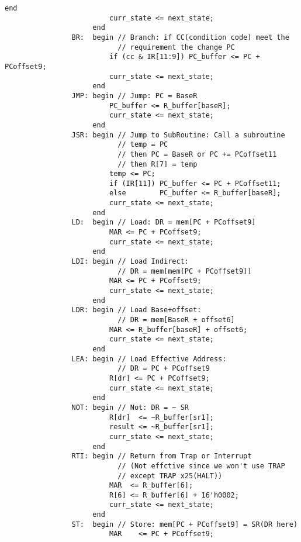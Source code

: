 \documentclass[UTF8,fontset=fandol]{ctexart}
\begin{document}
\begin{lstlisting}[style = verilogstyle, caption = 模块文件源代码, label = Code:Source, breaklines = true]
                         end
                         curr_state <= next_state;
                     end
                BR:  begin // Branch: if CC(condition code) meet the
                           // requirement the change PC
                         if (cc & IR[11:9]) PC_buffer <= PC + PCoffset9;
                         curr_state <= next_state;
                     end
                JMP: begin // Jump: PC = BaseR
                         PC_buffer <= R_buffer[baseR];
                         curr_state <= next_state;
                     end
                JSR: begin // Jump to SubRoutine: Call a subroutine
                           // temp = PC
                           // then PC = BaseR or PC += PCoffset11
                           // then R[7] = temp
                         temp <= PC;
                         if (IR[11]) PC_buffer <= PC + PCoffset11;
                         else        PC_buffer <= R_buffer[baseR];
                         curr_state <= next_state;
                     end
                LD:  begin // Load: DR = mem[PC + PCoffset9]
                         MAR <= PC + PCoffset9;
                         curr_state <= next_state;
                     end
                LDI: begin // Load Indirect: 
                           // DR = mem[mem[PC + PCoffset9]]
                         MAR <= PC + PCoffset9;
                         curr_state <= next_state;
                     end
                LDR: begin // Load Base+offset:
                           // DR = mem[BaseR + offset6]
                         MAR <= R_buffer[baseR] + offset6;
                         curr_state <= next_state;
                     end
                LEA: begin // Load Effective Address:
                           // DR = PC + PCoffset9
                         R[dr] <= PC + PCoffset9;
                         curr_state <= next_state;
                     end
                NOT: begin // Not: DR = ~ SR
                         R[dr]  <= ~R_buffer[sr1];
                         result <= ~R_buffer[sr1];
                         curr_state <= next_state;
                     end
                RTI: begin // Return from Trap or Interrupt
                           // (Not effctive since we won't use TRAP
                           // except TRAP x25(HALT))
                         MAR  <= R_buffer[6];
                         R[6] <= R_buffer[6] + 16'h0002;
                         curr_state <= next_state;
                     end
                ST:  begin // Store: mem[PC + PCoffset9] = SR(DR here)
                         MAR    <= PC + PCoffset9;

\end{lstlisting}
\end{document}
